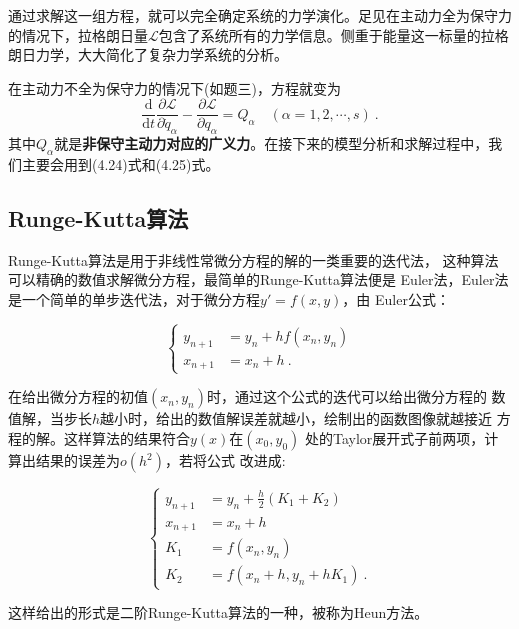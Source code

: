 \documentclass[a4paper,c5size,twoside,UTF8]{ctexart} %
\newcommand{\FS}[2]{\displaystyle\frac{#1}{#2}}
\numberwithin{equation}{section}   %
\begin{document}
通过求解这一组方程，就可以完全确定系统的力学演化。足见在主动力全为保守力的情况下，拉格朗日量$\mathcal{L}$包含了系统所有的力学信息。侧重于能量这一标量的拉格朗日力学，大大简化了复杂力学系统的分析。

在主动力不全为保守力的情况下(如题三)，方程就变为
\begin{equation}
    \frac{\mathrm{d}}{\mathrm{d} t} \frac{\partial \mathcal{L}}{\partial \dot{q}_{\alpha}}-\frac{\partial \mathcal{L}}{\partial q_{\alpha}}=Q_\alpha \quad(\alpha=1,2, \cdots, s)~.
\end{equation}
其中$Q_\alpha$就是\textbf{非保守主动力对应的广义力}。在接下来的模型分析和求解过程中，我们主要会用到(4.24)式和(4.25)式。


\newpage

\subsection{Runge-Kutta算法}
Runge-Kutta算法是用于非线性常微分方程的解的一类重要的迭代法，
这种算法可以精确的数值求解微分方程，最简单的Runge-Kutta算法便是
Euler法，Euler法是一个简单的单步迭代法，对于微分方程$y'=f\left(x,y\right)$，由
Euler公式：

\begin{equation}
	\left\{
		\begin{aligned}
			y_{n+1}&= y_n+hf\left( x_n,y_n \right) \\
			x_{n+1}&=x_n+h~.
		\end{aligned}
	\right.
\end{equation}

在给出微分方程的初值$(x_n,y_n)$时，通过这个公式的迭代可以给出微分方程的
数值解，当步长$h$越小时，给出的数值解误差就越小，绘制出的函数图像就越接近
方程的解。这样算法的结果符合$y\left(x\right)$在$\left( x_0,y_0 \right)$
处的Taylor展开式子前两项，计算出结果的误差为$o\left( h^2 \right)$，若将公式
改进成:

\begin{equation}
	\left\{
		\begin{aligned}
			y_{n+1}&= y_n+\FS{h}{2}\left( K_1+K_2 \right) \\
			x_{n+1}&=x_n+h \\
			K_1&=f\left( x_n,y_n \right) \\
			K_2&=f\left( x_{n}+h,y_n+hK_1 \right)~.
		\end{aligned}
	\right.
\end{equation}

这样给出的形式是二阶Runge-Kutta算法的一种，被称为Heun方法。
\end{document}
